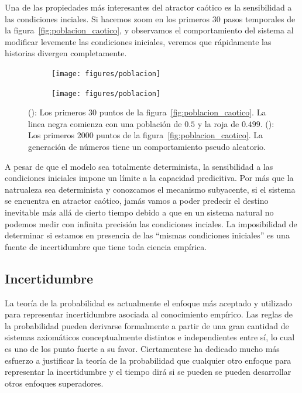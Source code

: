 \documentclass[a4paper,10pt]{book}
\begin{document}
Una de las propiedades más interesantes del atractor caótico es la sensibilidad a las condiciones inciales.
Si hacemos zoom en los primeros 30 pasos temporales de la figura~\ref{fig:poblacion_caotico}, y observamos el comportamiento del sistema al modificar levemente las condiciones iniciales, veremos que rápidamente las historias divergen completamente.
\begin{figure}[ht!]
    \centering
    \begin{subfigure}[b]{0.4\textwidth}
    \centering
    \texttt{[image: figures/poblacion]}
    \caption{}
    \label{fig:sensibilidad}
    \end{subfigure}
    \begin{subfigure}[b]{0.4\textwidth}
    \centering
    \texttt{[image: figures/poblacion]}
    \caption{}
    \label{fig:pseudo_aleatorio}
    \end{subfigure}
    \caption{(): Los primeros 30 puntos de la figura~\ref{fig:poblacion_caotico}. La linea negra comienza con una población de $0.5$ y la roja de $0.499$. (): Los primeros 2000 puntos de la figura~\ref{fig:poblacion_caotico}. La generación de números tiene un comportamiento pseudo aleatorio.}
    \label{fig:propiedades_caoticas}
\end{figure}
A pesar de que el modelo sea totalmente determinista, la sensibilidad a las condiciones iniciales impone un límite a la capacidad predicitiva.
Por más que la natrualeza sea determinista y conozcamos el mecanismo subyacente, si el sistema se encuentra en atractor caótico, jamás vamos a poder predecir el destino inevitable más allá de cierto tiempo debido a que en un sistema natural no podemos medir con infinita precisión las condiciones inciales.
La imposibilidad de determinar si estamos en presencia de las ``mismas condiciones iniciales'' es una fuente de incertidumbre que tiene toda ciencia empírica.

\subsection{Incertidumbre}

La teoría de la probabilidad es actualmente el enfoque más aceptado y utilizado para representar incertidumbre asociada al conocimiento empírico.
Las reglas de la probabilidad pueden derivarse formalmente a partir de una gran cantidad de sistemas axiomáticos conceptualmente distintos e independientes entre sí, lo cual es uno de los punto fuerte a su favor.
Ciertamentese ha dedicado mucho más esfuerzo a justificar la teoría de la probabilidad que cualquier otro enfoque para representar la incertidumbre y el tiempo dirá si se pueden se pueden desarrollar otros enfoques superadores.
\end{document}
